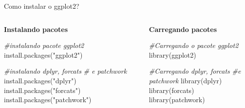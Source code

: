 \documentclass[
  ignorenonframetext,
]{beamer}
\newenvironment{Shaded}{}{}
\newcommand{\CommentTok}[1]{\textcolor[rgb]{0.38,0.63,0.69}{\textit{#1}}}
\newcommand{\FunctionTok}[1]{\textcolor[rgb]{0.02,0.16,0.49}{#1}}
\newcommand{\NormalTok}[1]{#1}
\newcommand{\StringTok}[1]{\textcolor[rgb]{0.25,0.44,0.63}{#1}}
\begin{document}
\begin{frame}[fragile]{Como instalar o ggplot2?}
\label{como-instalar-o-ggplot2}
\begin{columns}[T]
\begin{column}{0.4\linewidth}
\textbf{Instalando pacotes}

\begin{Shaded}
\begin{Highlighting}[]
\CommentTok{\#instalando pacote ggplot2}
\FunctionTok{install.packages}\NormalTok{(}\StringTok{"ggplot2"}\NormalTok{)}

\CommentTok{\#instalando dplyr, forcats }
\CommentTok{\# e patchwork}
\FunctionTok{install.packages}\NormalTok{(}\StringTok{"dplyr"}\NormalTok{)}
\FunctionTok{install.packages}\NormalTok{(}\StringTok{"forcats"}\NormalTok{)}
\FunctionTok{install.packages}\NormalTok{(}\StringTok{"patchwork"}\NormalTok{)}
\end{Highlighting}
\end{Shaded}
\end{column}

\begin{column}{0.4\linewidth}
\textbf{Carregando pacotes}

\begin{Shaded}
\begin{Highlighting}[]
\CommentTok{\#Carregando o pacote ggplot2}
\FunctionTok{library}\NormalTok{(ggplot2)}

\CommentTok{\#Carregando dplyr, forcats}
\CommentTok{\#e patchwork}
\FunctionTok{library}\NormalTok{(dplyr)}
\FunctionTok{library}\NormalTok{(forcats)}
\FunctionTok{library}\NormalTok{(patchwork)}
\end{Highlighting}
\end{Shaded}
\end{column}
\end{columns}
\end{frame}
\end{document}
